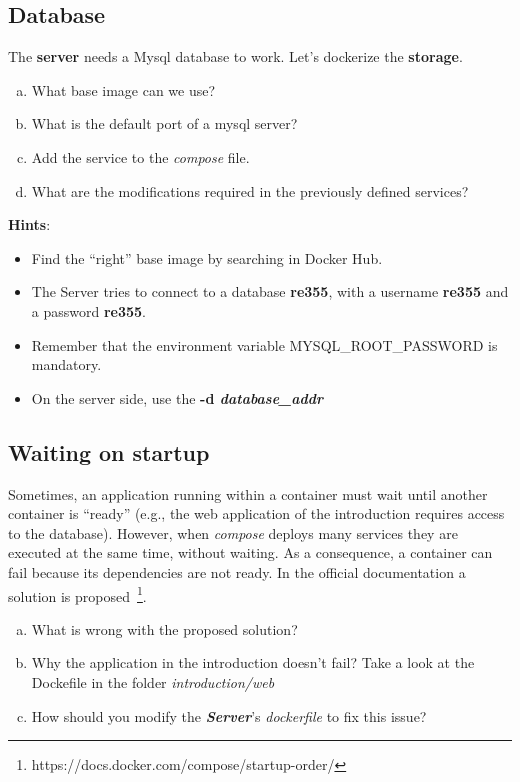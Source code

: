 \documentclass[a4paper,11pt]{exam}
\begin{document}
\subsection{Database}
	\begin{questions}
		\question The \textbf{server} needs a Mysql database to work. Let's dockerize the \textbf{storage}.
	
	\begin{enumerate}[(a)] %
		\item What base image can we use?
		\item What is the default port of a mysql server?
		\item Add the service to the \textit{compose} file.
		\item What are the modifications required in the previously defined services?
	\end{enumerate}
		\textbf{Hints}:
	\begin{itemize}
		\item Find the ``right'' base image by searching in Docker Hub.

		\item The Server tries to connect to a database \textbf{re355}, with a username \textbf{re355} and a password \textbf{re355}.

		\item Remember that the environment variable MYSQL\_ROOT\_PASSWORD is mandatory.

		\item On the server side, use the \textbf{-d \textit{database\_addr}}

	\end{itemize}
	\end{questions}
	
\subsection{Waiting on startup}	
	\begin{questions}

	\question Sometimes, an application running within a container must wait until another container is ``ready'' (e.g., the web application of the introduction requires access to the database). However, when \textit{compose} deploys many services they are executed at the same time, without waiting. As a consequence, a container can fail because its dependencies are not ready. In the official documentation a solution is proposed~\footnote{https://docs.docker.com/compose/startup-order/}.
	
		\begin{enumerate}[(a)] %
			\item What is wrong with the proposed solution?
			\item Why the application in the introduction doesn't fail? Take a look at the Dockefile in the folder \textit{introduction/web}
			\item How should you modify the \textit{\textbf{Server}}'s \textit{dockerfile} to fix this issue?
		\end{enumerate}
	\end{questions}
\end{document}
